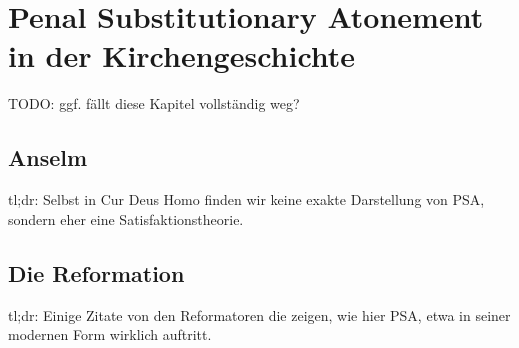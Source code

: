 \chapter{Penal Substitutionary Atonement in der Kirchengeschichte}
TODO: ggf. fällt diese Kapitel vollständig weg?
\section{Anselm}
tl;dr:
Selbst in Cur Deus Homo finden wir keine exakte Darstellung von PSA, sondern eher eine Satisfaktionstheorie.
\section{Die Reformation}
tl;dr:
Einige Zitate von den Reformatoren die zeigen, wie hier PSA, etwa in seiner modernen Form wirklich auftritt.

